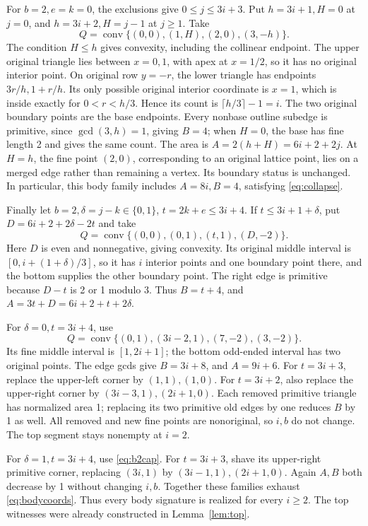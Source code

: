 \documentclass[11pt]{article}
\newcommand{\conv}{\operatorname{conv}}
\begin{document}
For \(b=2,e=k=0\), the exclusions give \(0\le j\le3i+3\).
Put \(h=3i+1,H=0\) at \(j=0\), and \(h=3i+2,H=j-1\) at \(j\ge1\).
Take
\begin{equation}\label{eq:B4witness}
 Q=\conv\{(0,0),(1,H),(2,0),(3,-h)\}.
\end{equation}
The condition \(H\le h\) gives convexity, including the collinear endpoint.
The upper original triangle lies between \(x=0,1\), with apex at \(x=1/2\),
so it has no original interior point.
On original row \(y=-r\), the lower triangle has endpoints
\(3r/h,1+r/h\). Its only possible original interior coordinate is \(x=1\),
which is inside exactly for \(0<r<h/3\). Hence its count is
\(\lceil h/3\rceil-1=i\).
The two original boundary points are the base endpoints. Every nonbase
outline subedge is primitive, since \(\gcd(3,h)=1\), giving \(B=4\);
when \(H=0\), the base has fine length 2 and gives the same count.
The area is \(A=2(h+H)=6i+2+2j\).
At \(H=h\), the fine point \((2,0)\), corresponding to an original lattice
point, lies on a merged edge rather than remaining a vertex. Its boundary
status is unchanged.
In particular, this body family includes \(A=8i,B=4\), satisfying
\eqref{eq:collapse}.

Finally let \(b=2,\delta=j-k\in\{0,1\}\), \(t=2k+e\le3i+4\).
If \(t\le3i+1+\delta\), put \(D=6i+2+2\delta-2t\) and take
\[
 Q=\conv\{(0,0),(0,1),(t,1),(D,-2)\}.
\]
Here \(D\) is even and nonnegative, giving convexity.
Its original middle interval is
\([0,i+(1+\delta)/3]\), so it has \(i\) interior points and one
boundary point there, and the bottom supplies the other boundary point.
The right edge is primitive because \(D-t\) is 2 or 1 modulo 3.
Thus \(B=t+4\), and \(A=3t+D=6i+2+t+2\delta\).

For \(\delta=0,t=3i+4\), use
\[
 Q=\conv\{(0,1),(3i-2,1),(7,-2),(3,-2)\}.
\]
Its fine middle interval is \([1,2i+1]\); the bottom odd-ended interval
has two original points. The edge gcds give \(B=3i+8\), and
\(A=9i+6\).
For \(t=3i+3\), replace the upper-left corner by \((1,1),(1,0)\).
For \(t=3i+2\), also replace the upper-right corner by
\((3i-3,1),(2i+1,0)\).
Each removed primitive triangle has normalized area 1; replacing its two
primitive old edges by one reduces \(B\) by 1 as well.
All removed and new fine points are nonoriginal, so \(i,b\) do not change.
The top segment stays nonempty at \(i=2\).

For \(\delta=1,t=3i+4\), use \eqref{eq:b2cap}.
For \(t=3i+3\), shave its upper-right primitive corner, replacing
\((3i,1)\) by \((3i-1,1),(2i+1,0)\).
Again \(A,B\) both decrease by 1 without changing \(i,b\).
Together these families exhaust \eqref{eq:bodycoords}.
Thus every body signature is realized for every \(i\ge2\).
The top witnesses were already constructed in Lemma~\ref{lem:top}.
\end{document}
